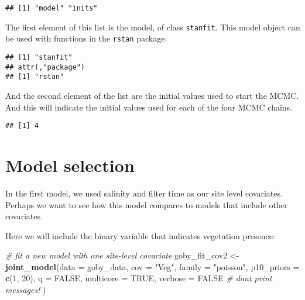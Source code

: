 \documentclass[
]{article}
\newenvironment{Shaded}{\begin{snugshade}}{\end{snugshade}}
\newcommand{\AttributeTok}[1]{\textcolor[rgb]{0.13,0.29,0.53}{#1}}
\newcommand{\CommentTok}[1]{\textcolor[rgb]{0.56,0.35,0.01}{\textit{#1}}}
\newcommand{\ConstantTok}[1]{\textcolor[rgb]{0.56,0.35,0.01}{#1}}
\newcommand{\DecValTok}[1]{\textcolor[rgb]{0.00,0.00,0.81}{#1}}
\newcommand{\FunctionTok}[1]{\textcolor[rgb]{0.13,0.29,0.53}{\textbf{#1}}}
\newcommand{\NormalTok}[1]{#1}
\newcommand{\OtherTok}[1]{\textcolor[rgb]{0.56,0.35,0.01}{#1}}
\newcommand{\SpecialCharTok}[1]{\textcolor[rgb]{0.81,0.36,0.00}{\textbf{#1}}}
\newcommand{\StringTok}[1]{\textcolor[rgb]{0.31,0.60,0.02}{#1}}
\begin{document}
\begin{verbatim}
## [1] "model" "inits"
\end{verbatim}

The first element of this list is the model, of class \texttt{stanfit}.
This model object can be used with functions in the \texttt{rstan}
package.

\begin{Shaded}
\end{Shaded}

\begin{verbatim}
## [1] "stanfit"
## attr(,"package")
## [1] "rstan"
\end{verbatim}

And the second element of the list are the initial values used to start
the MCMC. And this will indicate the initial values used for each of the
four MCMC chains.

\begin{Shaded}
\end{Shaded}

\begin{verbatim}
## [1] 4
\end{verbatim}

\section{Model selection}\label{model-selection}

In the first model, we used salinity and filter time as our site level
covariates. Perhaps we want to see how this model compares to models
that include other covariates.

Here we will include the binary variable that indicates vegetation
presence:

\begin{Shaded}
\begin{Highlighting}[]
\CommentTok{\# fit a new model with one site{-}level covariate}
\NormalTok{goby\_fit\_cov2 }\OtherTok{\textless{}{-}} \FunctionTok{joint\_model}\NormalTok{(}\AttributeTok{data =}\NormalTok{ goby\_data, }
                             \AttributeTok{cov =} \StringTok{"Veg"}\NormalTok{,}
                             \AttributeTok{family =} \StringTok{"poisson"}\NormalTok{, }
                             \AttributeTok{p10\_priors =} \FunctionTok{c}\NormalTok{(}\DecValTok{1}\NormalTok{, }\DecValTok{20}\NormalTok{),}
                             \AttributeTok{q =} \ConstantTok{FALSE}\NormalTok{, }
                             \AttributeTok{multicore =} \ConstantTok{TRUE}\NormalTok{,}
                             \AttributeTok{verbose =} \ConstantTok{FALSE} \CommentTok{\# don\textquotesingle{}t print messages!}
\NormalTok{                            )}
\end{Highlighting}
\end{Shaded}
\end{document}
